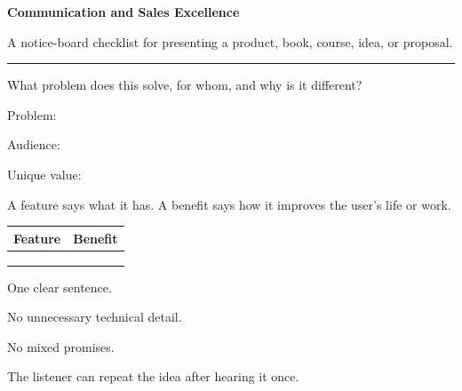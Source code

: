 \documentclass[10pt,a4paper]{article}
\newcommand{\CheckLine}{\raisebox{0.2ex}{\Large$\square$}\hspace{1mm}}
\newcommand{\FillLine}{\makebox[0.82\linewidth]{\hrulefill}}
\newcommand{\pagetitle}[2]{%
  {\fontsize{26}{29}\selectfont\bfseries #1}\par
  {\large\color{SoftInk}#2}\par\vspace{3mm}\hrule\vspace{4mm}
}
\begin{document}

\newpage

\pagetitle{Communication and Sales Excellence}{A notice-board checklist for presenting a product, book, course, idea, or proposal.}

\begin{minipage}[t]{0.49\linewidth}
\begin{tcolorbox}[usebox,title={1. Value proposition}]
What problem does this solve, for whom, and why is it different?\par\vspace{2mm}
\CheckLine Problem: \FillLine\par\vspace{2mm}
\CheckLine Audience: \FillLine\par\vspace{2mm}
\CheckLine Unique value: \FillLine
\end{tcolorbox}

\begin{tcolorbox}[usebox,title={2. Benefits before features}]
A feature says what it has. A benefit says how it improves the user's life or work.\par\vspace{2mm}
\begin{tabularx}{\linewidth}{X X}
\textbf{Feature} & \textbf{Benefit}\\\hline
\rule{0pt}{7mm} & \\
\rule{0pt}{7mm} & \\
\rule{0pt}{7mm} & \\
\end{tabularx}
\end{tcolorbox}

\begin{tcolorbox}[usebox,title={3. Keep the message simple}]
\CheckLine One clear sentence.\par
\CheckLine No unnecessary technical detail.\par
\CheckLine No mixed promises.\par
\CheckLine The listener can repeat the idea after hearing it once.
\end{tcolorbox}
\end{minipage}\hfill
\end{document}
